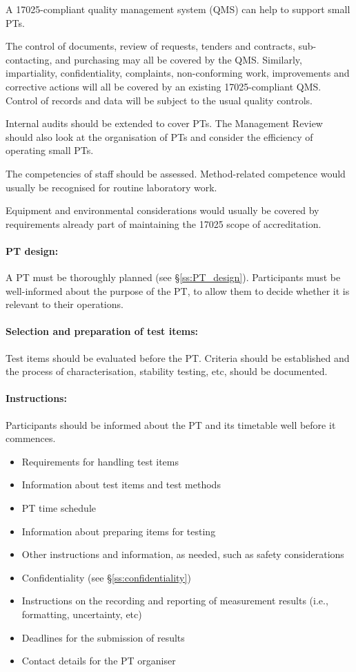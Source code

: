 A 17025-compliant quality management system (QMS) can help to support small PTs.

The control of documents, review of requests, tenders and contracts, sub-contacting, and purchasing may all be covered by the QMS. Similarly, impartiality, confidentiality, complaints, non-conforming work, improvements and corrective actions will all be covered by an existing 17025-compliant QMS. Control of records and data will be subject to the usual quality controls.

Internal audits should be extended to cover PTs. The Management Review should also look at the organisation of PTs and consider the efficiency of operating small PTs. 

The competencies of staff should be assessed. Method-related competence would usually be recognised for routine laboratory work.

Equipment and environmental considerations would usually be covered by requirements already part of maintaining the 17025 scope of accreditation.

\paragraph{PT design: }
A PT must be thoroughly planned (see \S\ref{ss:PT_design}). Participants must be well-informed about the purpose of the PT, to allow them to decide whether it is relevant to their operations.

\paragraph{Selection and preparation of test items:}
Test items should be evaluated before the PT. Criteria should be established and the process of characterisation, stability testing, etc, should be documented. 

\paragraph{Instructions:}
Participants should be informed about the PT and its timetable well before it commences. 

\begin{itemize}
	\item Requirements for handling test items
	\item Information about test items and test methods
	\item PT time schedule
	\item Information about preparing items for testing
	\item Other instructions and information, as needed, such as safety considerations
	\item Confidentiality (see \S\ref{ss:confidentiality})
	\item Instructions on the recording and reporting of measurement results (i.e., formatting, uncertainty, etc)
	\item Deadlines for the submission of results
	\item Contact details for the PT organiser
\end{itemize}

